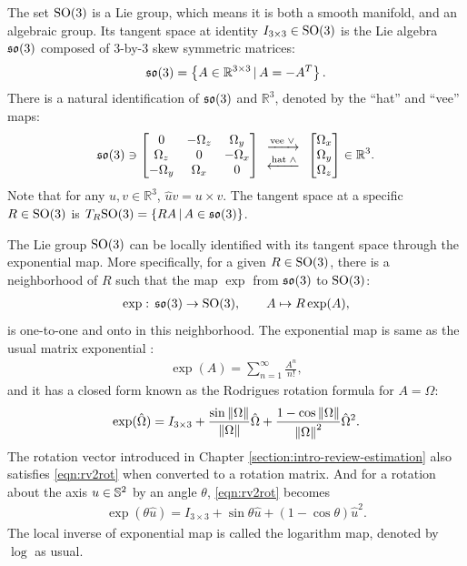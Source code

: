 The set $\mathrm{SO}(3)$ is a Lie group, which means it is both a smooth manifold, and an algebraic group.
Its tangent space at identity $I_{3\times 3} \in \mathrm{SO}(3)$ is the Lie algebra $\mathfrak{so}(3)$ composed of 3-by-3 skew symmetric matrices:
\begin{align}
	\mathfrak{so}(3) = \left\{ A \in \mathbb{R}^{3\times 3} \,|\, A = -A^T \right\}.
\end{align}
There is a natural identification of $\mathfrak{so}(3)$ and $\mathbb{R}^3$, denoted by the ``hat'' and ``vee'' maps:
\begin{align}
	\mathfrak{so}(3) \ni\begin{bmatrix}
		0 & -\Omega_z & \Omega_y \\
		\Omega_z & 0 & -\Omega_x \\
		-\Omega_y & \Omega_x & 0
	\end{bmatrix} \begin{array}{c}
		\xrightarrow{\text{vee } \vee} \\ \xleftarrow{\text{hat } \wedge}
	\end{array} \begin{bmatrix}
		\Omega_x \\ \Omega_y \\ \Omega_z
	\end{bmatrix} \in \mathbb{R}^3.
\end{align}
Note that for any $u,v\in\mathbb{R}^3$, $\hat{u}v = u\times v$.
The tangent space at a specific $R\in \mathrm{SO}(3)$ is $T_R\mathrm{SO}(3) = \{ RA \,|\, A\in\mathfrak{so}(3) \}$.

The Lie group $\mathrm{SO}(3)$ can be locally identified with its tangent space through the exponential map.
More specifically, for a given $R\in \mathrm{SO}(3)$, there is a neighborhood of $R$ such that the map $\exp$ from $\mathfrak{so}(3)$ to $\mathrm{SO}(3)$:
\begin{align*}
	\exp:\, \mathfrak{so}(3)\to\mathrm{SO}(3), \qquad A \mapsto R\exp(A),
\end{align*}
is one-to-one and onto in this neighborhood.
The exponential map is same as the usual matrix exponential \cite{hall2003lie}:
\begin{align}
	\exp(A) = \sum_{n=1}^\infty \frac{A^n}{n!},
\end{align}
and it has a closed form known as the Rodrigues rotation formula for $A = \hat{\Omega}$:
\begin{align} \label{eqn:rv2rot}
	\exp(\hat{\Omega}) = I_{3\times 3} + \frac{\sin\left\| \Omega \right\|}{\left\| \Omega \right\|} \hat{\Omega} + \frac{1-\cos\left\| \Omega \right\|}{\left\| \Omega \right\|^2} \hat{\Omega}^2.
\end{align}
The rotation vector introduced in Chapter \ref{section:intro-review-estimation} also satisfies \eqref{eqn:rv2rot} when converted to a rotation matrix.
And for a rotation about the axis $u\in\mathbb{S}^2$ by an angle $\theta$, \eqref{eqn:rv2rot} becomes
\begin{align} \label{eqn:aa2rot}
	\exp(\theta\hat{u}) = I_{3\times 3} + \sin\theta \hat{u} + (1-\cos\theta)\hat{u}^2.
\end{align}
The local inverse of exponential map is called the logarithm map, denoted by $\log$ as usual.


